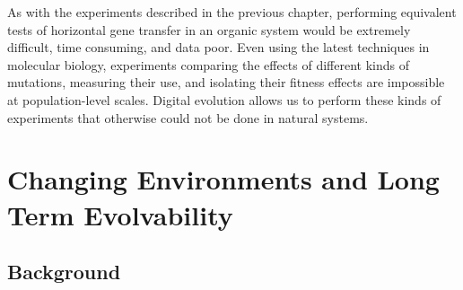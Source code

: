 \documentclass[PhD]{msu-thesis}
\begin{document}
As with the experiments described in the previous chapter, performing equivalent tests of horizontal gene transfer in an organic system would be extremely difficult, time consuming, and data poor. Even using the latest techniques in molecular biology, experiments comparing the effects of different kinds of mutations, measuring their use, and isolating their fitness effects are impossible at population-level scales\cite{peng_effects_nodate}.  
Digital evolution allows us to perform these kinds of experiments that otherwise could not be done in natural systems. 



\chapter{Changing Environments and Long Term Evolvability}
\label{chap:ce-longterm}
\section{Background}
\end{document}
